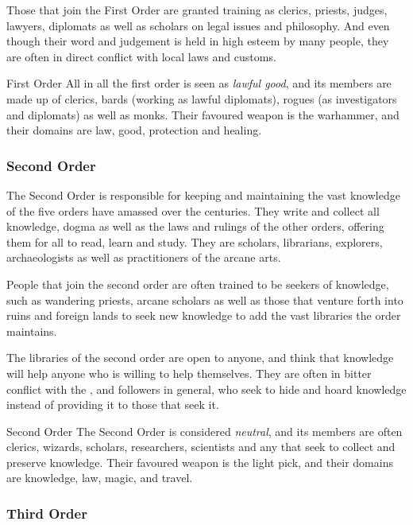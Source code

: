 Those that join the First Order are granted training as clerics, priests,
judges, lawyers, diplomats as well as scholars on legal issues and
philosophy. And even though their word and judgement is held in high esteem by
many people, they are often in direct conflict with local laws and customs.

\begin{35e}{First Order}
  All in all the first order is seen as \emph{lawful good}, and its members
  are made up of clerics, bards (working as lawful diplomats), rogues (as
  investigators and diplomats) as well as monks. Their favoured weapon is the
  warhammer, and their domains are law, good, protection and healing.
\end{35e}

\subsubsection{Second Order}
\label{sec:Second Order}

The Second Order is responsible for keeping and maintaining the vast knowledge
of the five orders have amassed over the centuries. They write and collect all
knowledge, dogma as well as the laws and rulings of the other orders, offering
them for all to read, learn and study. They are scholars, librarians,
explorers, archaeologists as well as practitioners of the arcane arts.

People that join the second order are often trained to be seekers of
knowledge, such as wandering priests, arcane scholars as well as those that
venture forth into ruins and foreign lands to seek new knowledge to add the
vast libraries the order maintains.

The libraries of the second order are open to anyone, and think that knowledge
will help anyone who is willing to help themselves. They are often in bitter
conflict with the , and 
followers in general, who seek to hide and hoard knowledge instead of
providing it to those that seek it.

\begin{35e}{Second Order}
  The Second Order is considered \emph{neutral}, and its members are often
  clerics, wizards, scholars, researchers, scientists and any that seek to
  collect and preserve knowledge. Their favoured weapon is the light pick,
  and their domains are knowledge, law, magic, and travel.
\end{35e}

\subsubsection{Third Order}
\label{sec:Third Order}

